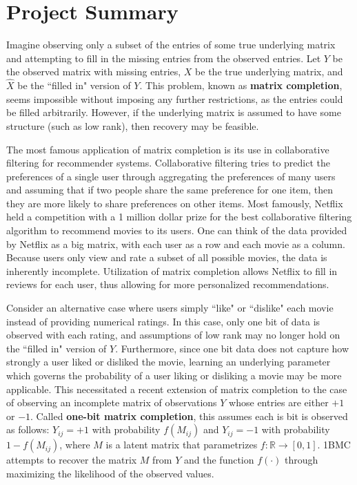 \section{Project Summary}
Imagine observing only a subset of the entries of some true underlying matrix and attempting to fill in the missing entries from the observed entries. Let $Y$ be the observed matrix with missing entries, $X$ be the true underlying matrix, and $\hat{X}$ be the ``filled in" version of $Y$. This problem, known as \textbf{matrix completion}, seems impossible without imposing any further restrictions, as the entries could be filled arbitrarily. However, if the underlying matrix is assumed to have some structure (such as low rank), then recovery may be feasible.

The most famous application of matrix completion is its use in collaborative filtering for recommender systems. Collaborative filtering tries to predict the preferences of a single user through aggregating the preferences of many users and assuming that if two people share the same preference for one item, then they are more likely to share preferences on other items. Most famously, Netflix held a competition with a 1 million dollar prize for the best collaborative filtering algorithm to recommend movies to its users. One can think of the data provided by Netflix as a big matrix, with each user as a row and each movie as a column. Because users only view and rate a subset of all possible movies, the data is inherently incomplete. Utilization of matrix completion allows Netflix to fill in reviews for each user, thus allowing for more personalized recommendations.

Consider an alternative case where users simply ``like" or ``dislike" each movie instead of providing numerical ratings. In this case, only one bit of data is observed with each rating, and assumptions of low rank may no longer hold on the ``filled in" version of $Y$. Furthermore, since one bit data does not capture how strongly a user liked or disliked the movie, learning an underlying parameter which governs the probability of a user liking or disliking a movie may be more applicable. This necessitated a recent extension of matrix completion to the case of observing an incomplete matrix of observations $Y$ whose entries are either $+1$ or $-1$. Called \textbf{one-bit matrix completion}, this assumes each is bit is observed as follows: $Y_{ij} = +1$ with probability $f(M_{ij})$ and $Y_{ij} = -1$ with probability $1 - f(M_{ij})$, where $M$ is a latent matrix that parametrizes $f:\mathbb{R} \rightarrow [0,1]$. 1BMC attempts to recover the matrix $M$ from $Y$ and the function $f(\cdot)$ through maximizing the likelihood of the observed values.

